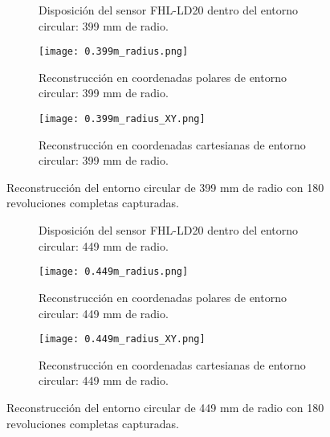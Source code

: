 \begin{figure}[H]
	\centering
	\begin{subfigure}{\textwidth}
		\centering
		\caption{Disposición del sensor FHL-LD20 dentro del entorno circular: 399 mm de radio.}
		\label{fig:disposicion_lidar_var6}
		\vspace{1em}
	\end{subfigure}
	\begin{subfigure}{0.45\textwidth}
		\centering
		\texttt{[image: 0.399m\_radius.png]}
		\caption{Reconstrucción en coordenadas polares de entorno circular: 399 mm de radio.}
		\label{fig:399m_radius_xy}
	\end{subfigure}
	\hspace{1em}
	\begin{subfigure}{0.45\textwidth}
		\centering
		\texttt{[image: 0.399m\_radius\_XY.png]}
		\caption{Reconstrucción en coordenadas cartesianas de entorno circular: 399 mm de radio.}
		\label{fig:399m_radius}
	\end{subfigure}
	\caption{Reconstrucción del entorno circular de 399 mm de radio con 180 revoluciones completas capturadas.}
	\label{fig:disposicion_lidar_var_dist6}
\end{figure}

\begin{figure}[H]
	\centering
	\begin{subfigure}{\textwidth}
		\centering
		\caption{Disposición del sensor FHL-LD20 dentro del entorno circular: 449 mm de radio.}
		\label{fig:disposicion_lidar_var7}
		\vspace{1em}
	\end{subfigure}
	\begin{subfigure}{0.45\textwidth}
		\centering
		\texttt{[image: 0.449m\_radius.png]}
		\caption{Reconstrucción en coordenadas polares de entorno circular: 449 mm de radio.}
		\label{fig:449m_radius_xy}
	\end{subfigure}
	\hspace{1em}
	\begin{subfigure}{0.45\textwidth}
		\centering
		\texttt{[image: 0.449m\_radius\_XY.png]}
		\caption{Reconstrucción en coordenadas cartesianas de entorno circular: 449 mm de radio.}
		\label{fig:449m_radius}
	\end{subfigure}
	\caption{Reconstrucción del entorno circular de 449 mm de radio con 180 revoluciones completas capturadas.}
	\label{fig:disposicion_lidar_var_dist7}
\end{figure}

